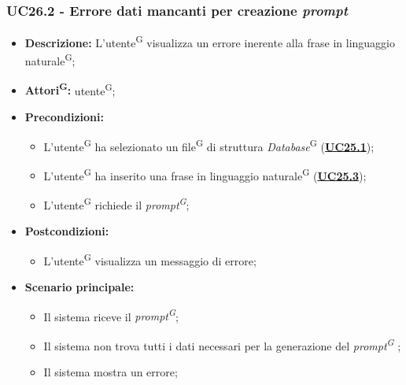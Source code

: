 \subsubsection{UC26.2 - Errore dati mancanti per creazione \textit{prompt}}
\label{sec:UC26.2}
\begin{itemize}
	\item \textbf{Descrizione:} L’utente\textsuperscript{G} visualizza un errore inerente alla frase in linguaggio naturale\textsuperscript{G};
	\item \textbf{Attori\textsuperscript{G}:} utente\textsuperscript{G};
	\item \textbf{Precondizioni:} 
	\begin{itemize}
		\item L’utente\textsuperscript{G} ha selezionato un file\textsuperscript{G} di struttura \textit{Database}\textsuperscript{G} (\hyperref[sec:UC25.1]{\textbf{UC25.1}});
		\item L’utente\textsuperscript{G} ha inserito una frase in linguaggio naturale\textsuperscript{G} (\hyperref[sec:UC25.3]{\textbf{UC25.3}});
		\item L’utente\textsuperscript{G} richiede il \textit{prompt\textsuperscript{G}};
	\end{itemize}
	\item \textbf{Postcondizioni:} 
	\begin{itemize}
		\item L’utente\textsuperscript{G} visualizza un messaggio di errore;
	\end{itemize}
	\item \textbf{Scenario principale:} 
	\begin{itemize}
		\item Il sistema riceve il \textit{prompt\textsuperscript{G}};
		\item Il sistema non trova tutti i dati necessari per la generazione del \textit{prompt\textsuperscript{G}} ;
		\item Il sistema mostra un errore;
	\end{itemize}
\end{itemize}

